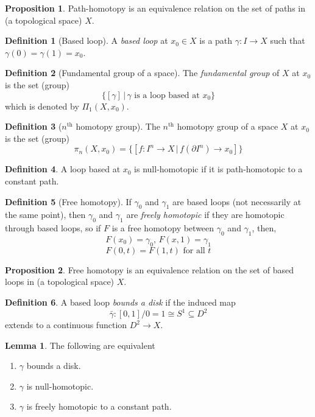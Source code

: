 \documentclass[a4paper,14pt]{extarticle}
\theoremstyle{definition}
\newtheorem*{definition}{Definition}
\newtheorem*{lemma}{Lemma}
\newtheorem*{proposition}{Proposition}
\begin{document}
\begin{proposition}
  Path-homotopy is an equivalence relation on the set of paths in (a topological space) $X$.
\end{proposition}

\begin{definition}[Based loop]
  A \emph{based loop} at $x_0\in X$ is a path $\gamma:I\rightarrow X$ such that 
  $\gamma(0)=\gamma(1)=x_0$.
\end{definition}

\begin{definition}[Fundamental group of a space]
  The \emph{fundamental group} of $X$ at $x_0$ is the set (group)
  \[\{[\gamma]\,|\,\gamma\text{ is a loop based at }x_0\}\]
  which is denoted by $\Pi_1(X,x_0)$.
\end{definition}

\begin{definition}[$n^{\text{th}}$ homotopy group]
  The $n^{\text{th}}$ homotopy group of a space $X$ at $x_0$ is the set (group)
  \[\pi_n(X,x_0)=\{[f:I^n\rightarrow X\,|\,f(\partial I^n)\rightarrow x_0]\}\]
\end{definition}

\begin{definition}
  A loop based at $x_0$ is null-homotopic if it is path-homotopic to a constant path.
\end{definition}

\begin{definition}[Free homotopy]
  If $\gamma_0$ and $\gamma_1$ are based loops (not necessarily at the same point), then 
  $\gamma_0$ and $\gamma_1$ are \emph{freely homotopic} if they are homotopic through 
  based loops, so if $F$ is a free homotopy between $\gamma_0$ and $\gamma_1$, then,
  \[F(x_0)=\gamma_0, \,F(x,1)=\gamma_1\] \[F(0,t)=F(1,t)\text{ for all }t\]
\end{definition}

\begin{proposition}
  Free homotopy is an equivalence relation on the set of based loops in (a topological space)
  $X$.
\end{proposition}

\begin{definition}
  A based loop \emph{bounds a disk} if the induced map \[\bar{\gamma}:[0,1]/
  {\scriptstyle 0=1}\cong S^1
  \subseteq D^2\] extends to a continuous function $D^2\rightarrow X$.
\end{definition}

\begin{lemma}
  The following are equivalent
  \begin{enumerate}
    \item $\gamma$ bounds a disk. 
    \item $\gamma$ is null-homotopic.
    \item $\gamma$ is freely homotopic to a constant path.
  \end{enumerate}
\end{lemma}
\end{document}
